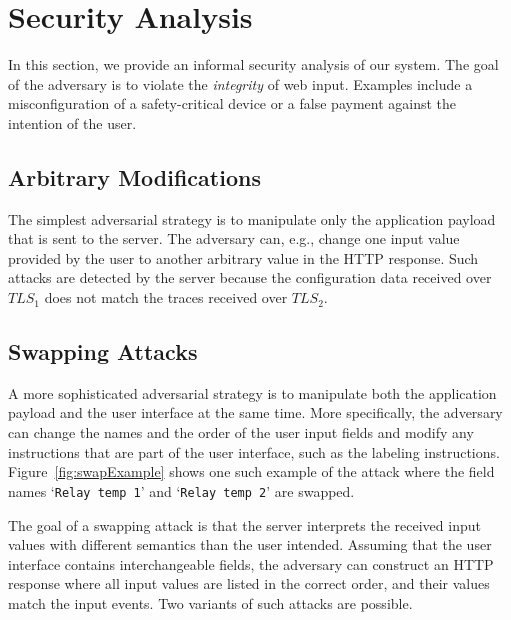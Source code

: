 \section{Security Analysis}
\label{sec:securityAnalysis_IK}

In this section, we provide an informal security analysis of our system. The goal of the adversary is to violate the \emph{integrity} of web input. Examples include a misconfiguration of a safety-critical device or a false payment against the intention of the user. 

\subsection{Arbitrary Modifications} 

The simplest adversarial strategy is to manipulate only the application payload that is sent to the server. The adversary can, e.g., change one input value provided by the user to another arbitrary value in the HTTP response. Such attacks are detected by the server because the configuration data received over $TLS_1$ does not match the traces received over $TLS_2$.


\subsection{Swapping Attacks}

A more sophisticated adversarial strategy is to manipulate both the application payload and the user interface at the same time. More specifically, the adversary can change the names and the order of the user input fields and modify any instructions that are part of the user interface, such as the labeling instructions. Figure~\ref{fig:swapExample} shows one such example of the attack where the field names `\texttt{Relay temp 1}' and `\texttt{Relay temp 2}' are swapped.


The goal of a swapping attack is that the server interprets the received input values with different semantics than the user intended. Assuming that the user interface contains interchangeable fields, the adversary can construct an HTTP response where all input values are listed in the correct order, and their values match the input events. Two variants of such attacks are possible. 

